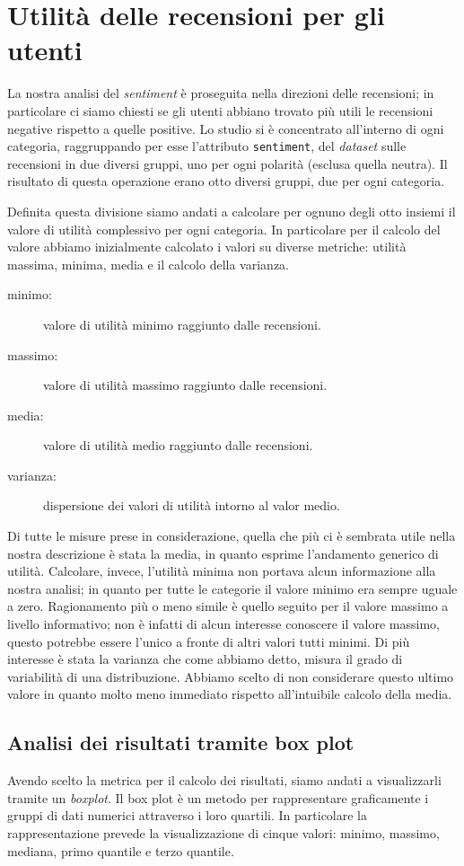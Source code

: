 		
	\section{Utilità delle recensioni per gli utenti}
		La nostra analisi del \textit{sentiment} è proseguita nella direzioni delle recensioni; in particolare ci siamo chiesti se gli utenti abbiano trovato più utili le recensioni negative rispetto a quelle positive. Lo studio si è concentrato all'interno di ogni categoria, raggruppando per esse l'attributo \verb|sentiment|, del \textit{dataset} sulle recensioni in due diversi gruppi, uno per ogni polarità (esclusa quella neutra). Il risultato di questa operazione erano otto diversi gruppi, due per ogni categoria. 
		
		Definita questa divisione siamo andati a calcolare per ognuno degli otto insiemi il valore di utilità complessivo per ogni categoria. In particolare per il calcolo del valore abbiamo inizialmente calcolato i valori su diverse metriche: utilità massima, minima, media e il calcolo della varianza.
		
		\begin{description}
			\item[minimo:] valore di utilità minimo raggiunto dalle recensioni.
			\item[massimo:] valore di utilità massimo raggiunto dalle recensioni.
			\item[media:] valore di utilità medio raggiunto dalle recensioni.
			\item[varianza:] dispersione dei valori di utilità intorno al valor medio.
		\end{description}
	
		Di tutte le misure prese in considerazione, quella che più ci è sembrata utile nella nostra descrizione è stata la media, in quanto esprime l'andamento generico di utilità. Calcolare, invece, l'utilità minima non portava alcun informazione alla nostra analisi; in quanto per tutte le categorie il valore minimo era sempre uguale a zero. Ragionamento più o meno simile è quello seguito per il valore massimo a livello informativo; non è infatti di alcun interesse conoscere il valore massimo, questo potrebbe essere l'unico a fronte di altri valori tutti minimi. Di più interesse è stata la varianza che come abbiamo detto, misura il grado di variabilità di una distribuzione. Abbiamo scelto di non considerare questo ultimo valore in quanto molto meno immediato rispetto all'intuibile calcolo della media.
		
		\subsection{Analisi dei risultati tramite box plot}
			Avendo scelto la metrica per il calcolo dei risultati, siamo andati a visualizzarli tramite un \textit{boxplot}. Il box plot è un metodo per rappresentare graficamente i gruppi di dati numerici attraverso i loro quartili. In particolare la rappresentazione prevede la visualizzazione di cinque valori: minimo, massimo, mediana, primo quantile e terzo quantile.
			
